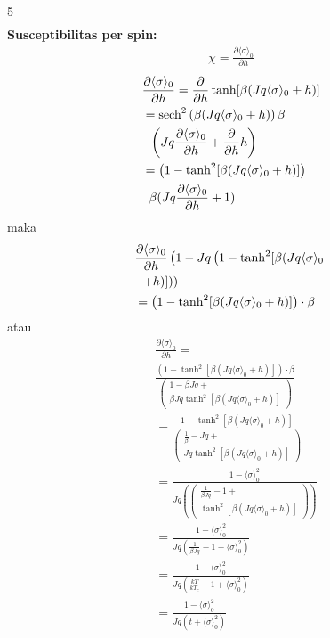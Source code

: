 \documentclass[a4paper  , 6 pt]{article}
\begin{document}
\begin{tiny}
\begin{multicols} {5}
\begin{align}
\end{align}
\textbf{Susceptibilitas per spin:} \newline 
\newcommand{\susep}{\langle \sigma \rangle_0} 
\begin{align}
\chi = \frac{\partial \susep}{\partial h}
\end{align}
\newcommand{\susun}{\frac{\partial \susep}{\partial h}}
\newcommand{\susur}{\frac{\partial}{\partial h}}
\newcommand{\sech}{\text{sech}}
\begin{align}
& \susun  = \susur \tanh [ \beta (J q \susep + h )] \nonumber \\ 
& = \sech^2 \left({\beta (J q \susep + h )} \right) \beta \nonumber \\
& \hspace{0.2 cm} \left( Jq \susun  + \susur h\right) \nonumber \\
& = \left( 1 - \tanh^2 [\beta (J q \susep  + h )]\right) \nonumber \\
&\hspace{0.2 cm}  \beta (J q \susun  + 1 ) \nonumber 
\end{align}
maka 
\begin{align}
&\susun \left(1 - Jq \left( 1 - \tanh^2 [\beta (Jq \susep \right. \right.  \nonumber \\ 
& \hspace{0.1 cm} \left. \left. +  h )]\right) \right) 
\nonumber \\
&  = \left( 1 - \tanh^2 [ \beta (Jq \susep + h )]\right) \cdot \beta
\end{align}
atau 
\begin{align}
& \susun =  \nonumber \\
&  \frac{(1 - \tanh^2 [\beta (Jq \susep +h )  ])\cdot\beta}{
\begin{pmatrix}
1 - \beta Jq + \\ \beta Jq \tanh^2 [\beta (Jq \susep + h)]
\end{pmatrix}
} \nonumber \\
& = \frac{1 - \tanh^2 [\beta (Jq \susep +h )  ]}{
\begin{pmatrix}
\frac{1}{\beta } - Jq + \\ Jq \tanh^2 [\beta (Jq \susep  + h )]
\end{pmatrix}
} \nonumber \\
& = \frac{1 - \susep^2 }{Jq \left( 
\begin{pmatrix}
\frac{1}{\beta Jq } - 1 +  \\ \tanh^2 [\beta (Jq \susep + h )]
\end{pmatrix}
\right)} \nonumber \\
& = \frac{1 - \susep^2 }{Jq \left( \frac{1}{\beta Jq } - 1 + \susep^2 \right)} \nonumber \\
& =\frac{1 - \susep^2 }{ Jq \left( \frac{kT}{kT_c } - 1 + \susep^2 \right)}   \nonumber \\
& = \boxed{\frac{1 - \susep^2}{Jq (t + \susep^2)}}
\end{align}


\end{multicols}
\end{tiny}
\end{document}
